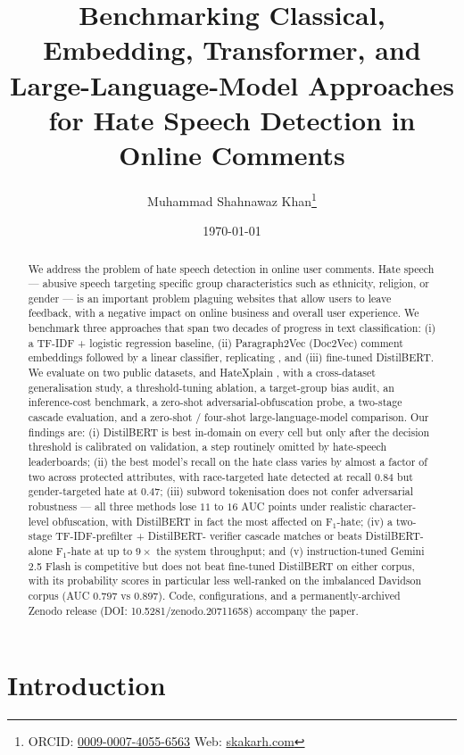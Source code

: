 \documentclass[11pt]{article}
\title{Benchmarking Classical, Embedding, Transformer, and
       Large-Language-Model Approaches\\
       for Hate Speech Detection in Online Comments}
\author[1]{Muhammad Shahnawaz Khan\thanks{ORCID: \href{https://orcid.org/0009-0007-4055-6563}{0009-0007-4055-6563} \quad Web: \href{https://www.skakarh.com}{skakarh.com}}}
\affil[1]{Independent Researcher \quad \texttt{shahnawaz.jrw@gmail.com}}
\date{\today}
\begin{document}
\maketitle

\begin{abstract}
We address the problem of hate speech detection in online user comments. Hate
speech --- abusive speech targeting specific group characteristics such as
ethnicity, religion, or gender --- is an important problem plaguing websites
that allow users to leave feedback, with a negative impact on online business
and overall user experience. We benchmark three approaches that span two
decades of progress in text classification: (i) a TF-IDF + logistic regression
baseline, (ii) Paragraph2Vec (Doc2Vec) comment embeddings followed by a linear
classifier, replicating \citet{djuric2015hate}, and (iii) fine-tuned
DistilBERT. We evaluate on two public datasets, \citet{davidson2017automated}
and HateXplain \citep{mathew2021hatexplain}, with a cross-dataset
generalisation study, a threshold-tuning ablation, a target-group bias audit,
an inference-cost benchmark, a zero-shot adversarial-obfuscation probe, a
two-stage cascade evaluation, and a zero-shot / four-shot large-language-model
comparison. Our findings are: (i) DistilBERT is best in-domain on every cell
but only after the decision threshold is calibrated on validation, a step
routinely omitted by hate-speech leaderboards; (ii) the best model's recall
on the hate class varies by almost a factor of two across protected
attributes, with race-targeted hate detected at recall $0.84$ but
gender-targeted hate at $0.47$; (iii) subword tokenisation does not
confer adversarial robustness --- all three methods lose $11$ to $16$ AUC
points under realistic character-level obfuscation, with DistilBERT in fact
the most affected on F$_1$-hate; (iv) a two-stage TF-IDF-prefilter + DistilBERT-
verifier cascade matches or beats DistilBERT-alone F$_1$-hate at up to
$9\times$ the system throughput; and (v) instruction-tuned Gemini 2.5 Flash
is competitive but does not beat fine-tuned DistilBERT on either corpus, with
its probability scores in particular less well-ranked on the imbalanced
Davidson corpus (AUC $0.797$ vs $0.897$). Code, configurations, and a
permanently-archived Zenodo release (DOI: 10.5281/zenodo.20711658) accompany
the paper.
\end{abstract}

\section{Introduction}
\end{document}
